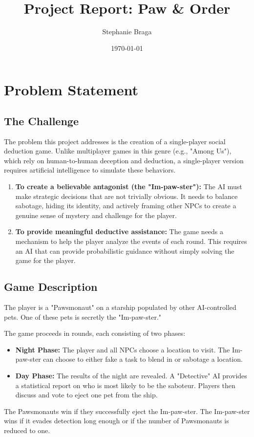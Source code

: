\documentclass{article}
\title{\textbf{Project Report: Paw \& Order}}
\author{Stephanie Braga}
\date{\today}
\begin{document}
\maketitle

\section{Problem Statement}

\subsection{The Challenge}
The problem this project addresses is the creation of a single-player social deduction game. Unlike multiplayer games in this genre (e.g., "Among Us"), which rely on human-to-human deception and deduction, a single-player version requires artificial intelligence to simulate these behaviors.
\begin{enumerate}
    \item \textbf{To create a believable antagonist (the "Im-paw-ster"):} The AI must make strategic decisions that are not trivially obvious. It needs to balance sabotage, hiding its identity, and actively framing other NPCs to create a genuine sense of mystery and challenge for the player.
    \item \textbf{To provide meaningful deductive assistance:} The game needs a mechanism to help the player analyze the events of each round. This requires an AI that can provide probabilistic guidance without simply solving the game for the player.
\end{enumerate}

\subsection{Game Description}
The player is a "Pawsmonaut" on a starship populated by other AI-controlled pets. One of these pets is secretly the "Im-paw-ster."

The game proceeds in rounds, each consisting of two phases:
\begin{itemize}
    \item \textbf{Night Phase:} The player and all NPCs choose a location to visit. The Im-paw-ster can choose to either fake a task to blend in or sabotage a location.
    \item \textbf{Day Phase:} The results of the night are revealed. A "Detective" AI provides a statistical report on who is most likely to be the saboteur. Players then discuss and vote to eject one pet from the ship.
\end{itemize}
The Pawsmonauts win if they successfully eject the Im-paw-ster. The Im-paw-ster wins if it evades detection long enough or if the number of Pawsmonauts is reduced to one.
\end{document}
